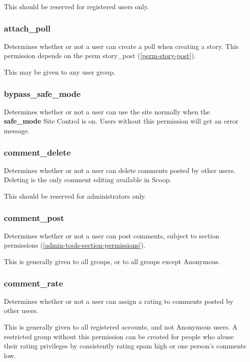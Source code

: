 This should be reserved for registered users only.

\subsubsection{attach\_poll}
\label{perm-attach-poll}

Determines whether or not a user can create a poll when creating a story.  This permission depends on the perm story\_post (\ref{perm-story-post}).

This may be given to any user group.

\subsubsection{bypass\_safe\_mode}
\label{perm-bypass-safe-mode}

Determines whether or not a user can use the site normally when the {\bf safe\_mode} Site Control is on. Users without this permission will get an error message.

\subsubsection{comment\_delete}
\label{perm-comment-delete}

Determines whether or not a user can delete comments posted by other users.  Deleting is the only comment editing available in Scoop.

This should be reserved for administrators only.

\subsubsection{comment\_post}
\label{perm-comment-post}

Determines whether or not a user can post comments, subject to section permissions (\ref{admin-tools-section-permissions}).

This is generally given to all groups, or to all groups except Anonymous.

\subsubsection{comment\_rate}
\label{perm-comment-rate}

Determines whether or not a user can assign a rating to comments posted by other users.

This is generally given to all registered accounts, and not Anonymous users.  A restricted group without this permission can be created for people who abuse their rating privileges by consistently rating spam high or one person's comments low.


